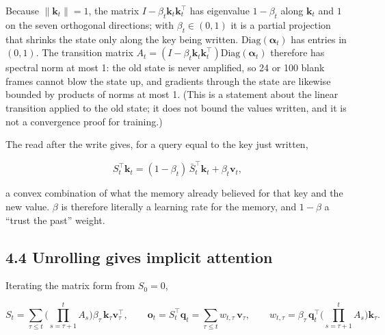 \documentclass[

]{article}
\begin{document}
Because \(\|\mathbf{k}_t\|=1\), the matrix \(I-\beta_t\mathbf{k}_t\mathbf{k}_t^\top\) has eigenvalue \(1-\beta_t\) along \(\mathbf{k}_t\) and \(1\) on the seven orthogonal directions; with \(\beta_t\in(0,1)\) it is a partial projection that shrinks the state only along the key being written. \(\mathrm{Diag}(\boldsymbol\alpha_t)\) has entries in \((0,1)\). The transition matrix \(A_t=(I-\beta_t\mathbf{k}_t\mathbf{k}_t^\top)\mathrm{Diag}(\boldsymbol\alpha_t)\) therefore has spectral norm at most 1: the old state is never amplified, so 24 or 100 blank frames cannot blow the state up, and gradients through the state are likewise bounded by products of norms at most 1. (This is a statement about the linear transition applied to the old state; it does not bound the values written, and it is not a convergence proof for training.)



The read after the write gives, for a query equal to the key just written,



\[

S_t^\top\mathbf{k}_t=(1-\beta_t)\,\bar S_t^\top\mathbf{k}_t+\beta_t\mathbf{v}_t ,

\]



a convex combination of what the memory already believed for that key and the new value. \(\beta\) is therefore literally a learning rate for the memory, and \(1-\beta\) a ``trust the past'' weight.



\subsection{4.4 Unrolling gives implicit attention}\label{unrolling-gives-implicit-attention}



Iterating the matrix form from \(S_0=0\),



\[

S_t=\sum_{\tau\le t}\Big(\prod_{s=\tau+1}^{t}A_s\Big)\beta_\tau\,\mathbf{k}_\tau\mathbf{v}_\tau^\top,

\qquad

\mathbf{o}_t=S_t^\top\mathbf{q}_t=\sum_{\tau\le t}w_{t,\tau}\,\mathbf{v}_\tau,

\qquad

w_{t,\tau}=\beta_\tau\,\mathbf{q}_t^\top\Big(\prod_{s=\tau+1}^{t}A_s\Big)\mathbf{k}_\tau .

\]
\end{document}
